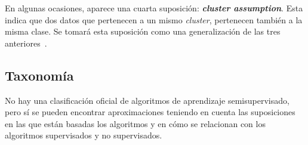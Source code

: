 En algunas ocasiones, aparece una cuarta suposición: \textit{\textbf{cluster assumption}}. Esta indica que dos datos que pertenecen a un mismo \textit{cluster}, pertenecen también a la misma clase. Se tomará esta suposición como una generalización de las tres anteriores~\cite{Engelen:semi-supervised}.


\subsection{Taxonomía}\label{sec3:tax}
No hay una clasificación oficial de algoritmos de aprendizaje semisupervisado, pero sí se pueden encontrar aproximaciones teniendo en cuenta las suposiciones en las que están basadas los algoritmos y en cómo se relacionan con los algoritmos supervisados y no supervisados.

